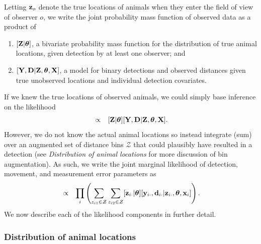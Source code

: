 \documentclass[12pt,fleqn]{article}
\begin{document}
Letting ${\bf z}_o$ denote the true locations of animals when they enter the field of view of observer $o$, we write the joint probability mass function of observed data as a product of
\begin{enumerate}
   \item $[{\bf Z}|\boldsymbol{\theta}]$, a bivariate probability mass function for the distribution of true animal locations, given detection by at least one observer; and
   \item $[{\bf Y},{\bf D}|{\bf Z},\boldsymbol{\theta},{\bf X}]$, a model for binary detections and observed distances given true unobserved locations and individual detection covariates.
\end{enumerate}
If we knew the true locations of observed animals, we could simply base inference on the likelihood
\begin{eqnarray*}
  [\boldsymbol{\theta} | {\bf Y},{\bf D}, {\bf X}] & \propto & [{\bf Z}|\boldsymbol{\theta}][{\bf Y},{\bf D}|{\bf Z},\boldsymbol{\theta},{\bf X}].
\end{eqnarray*}
However, we do not know the actual animal locations so instead integrate (sum) over an augmented set of distance bins $\mathcal{Z}$ that could plausibly have resulted in a detection (see \textit{Distribution of animal locations} for more discussion of bin augmentation).
As such, we write the joint marginal likelihood of detection, movement, and measurement error parameters as
\begin{eqnarray}
  [\boldsymbol{\theta} | {\bf Y},{\bf D}, {\bf X}] & \propto & \prod_i \left( \sum_{z_{i1} \in \mathcal{Z}} \sum_{z_{i2} \in \mathcal{Z}} [{\bf z}_{i \cdot} |\boldsymbol{\theta}][{\bf y}_{i \cdot},{\bf d}_{i \cdot}|{\bf z}_{i \cdot} , \boldsymbol{\theta} , {\bf x}_i]
   \right).
  \label{eq:lik}
\end{eqnarray}
We now describe each of the likelihood components in further detail.

\subsubsection{Distribution of animal locations}
\end{document}
